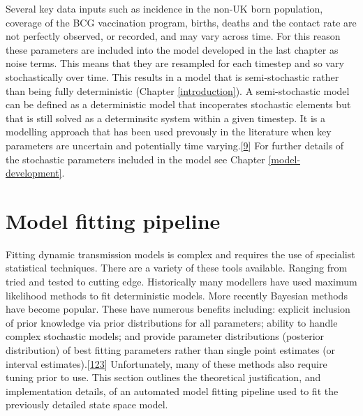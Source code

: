 \documentclass[11pt,twoside]{bristolthesis}
\begin{document}
  Several key data inputs such as incidence in the non-UK born population, coverage of the BCG vaccination program, births, deaths and the contact rate are not perfectly observed, or recorded, and may vary across time. For this reason these parameters are included into the model developed in the last chapter as noise terms. This means that they are resampled for each timestep and so vary stochastically over time. This results in a model that is semi-stochastic rather than being fully deterministic (Chapter \ref{introduction}). A semi-stochastic model can be defined as a deterministic model that incoperates stochastic elements but that is still solved as a determinsitc system within a given timestep. It is a modelling approach that has been used prevously in the literature when key parameters are uncertain and potentially time varying.{[}\protect\hyperlink{ref-Funk2016a}{9}{]} For further details of the stochastic parameters included in the model see Chapter \ref{model-development}.
  
  \hypertarget{fitting-pipeline}{%
  \section{Model fitting pipeline}\label{fitting-pipeline}}
  
  Fitting dynamic transmission models is complex and requires the use of specialist statistical techniques. There are a variety of these tools available. Ranging from tried and tested to cutting edge. Historically many modellers have used maximum likelihood methods to fit deterministic models. More recently Bayesian methods have become popular. These have numerous benefits including: explicit inclusion of prior knowledge via prior distributions for all parameters; ability to handle complex stochastic models; and provide parameter distributions (posterior distribution) of best fitting parameters rather than single point estimates (or interval estimates).{[}\protect\hyperlink{ref-Murray2015}{123}{]} Unfortunately, many of these methods also require tuning prior to use. This section outlines the theoretical justification, and implementation details, of an automated model fitting pipeline used to fit the previously detailed state space model.
  
\end{document}
